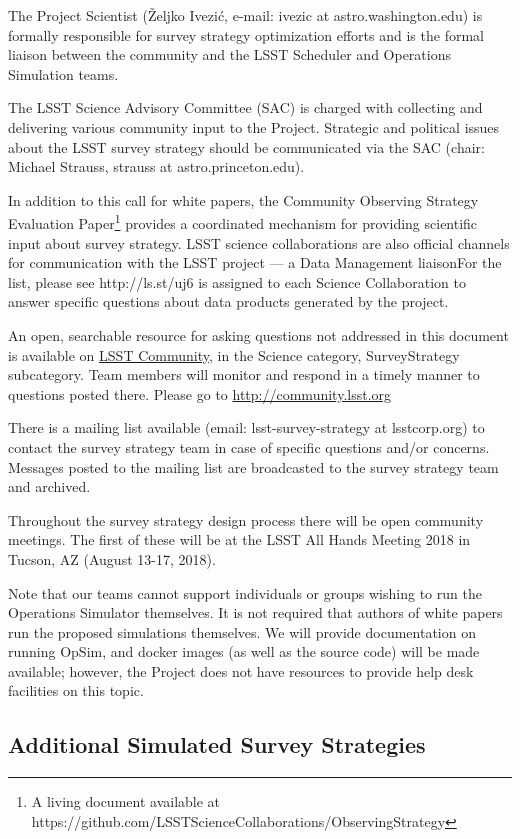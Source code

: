 \documentclass[DM,lsstdraft,toc,usenatbib]{lsstdoc}
\begin{document}
The Project Scientist (\v{Z}eljko Ivezi\'{c}, e-mail: ivezic at astro.washington.edu) is formally responsible for survey strategy optimization efforts and is the formal liaison between the community and the LSST Scheduler and Operations Simulation teams.

The LSST Science Advisory Committee (SAC) is charged with collecting and delivering various community input to the Project. Strategic and political issues about the LSST survey strategy should be communicated via the SAC (chair: Michael Strauss, strauss at astro.princeton.edu).

In addition to this call for white papers, the Community Observing Strategy Evaluation Paper\footnote{A living document available at https://github.com/LSSTScienceCollaborations/ObservingStrategy} provides a coordinated mechanism for providing scientific input about survey strategy. LSST science collaborations are also official channels for communication with the LSST project --- a Data Management 
liaison{For the list, please see http://ls.st/uj6}  is assigned to each Science Collaboration to answer specific questions
about data products generated by the project.

An open, searchable resource for asking questions not addressed in this document is available on \href{http://community.lsst.org}{LSST Community}, in the Science category, SurveyStrategy subcategory. Team members will monitor and respond in a timely manner to questions posted there. Please go to \url{http://community.lsst.org}

There is a mailing list available (email: lsst-survey-strategy at lsstcorp.org) to contact the survey strategy team in case of specific 
questions and/or concerns. Messages posted to the mailing list are broadcasted to the survey strategy team and archived. 

Throughout the survey strategy design process there will be open community meetings. The first of these will be 
at the LSST All Hands Meeting 2018 in Tucson, AZ (August 13-17, 2018). 

Note that our teams cannot support individuals or groups wishing to run the Operations Simulator themselves. 
It is not required that authors of white papers run the proposed simulations themselves. We will provide 
documentation on running OpSim, and docker images (as well as the source code) will be made available; however, the Project 
does not have resources to provide help desk facilities on this topic. 


\subsection{Additional Simulated Survey Strategies \label{sec:surveys}}
\end{document}
